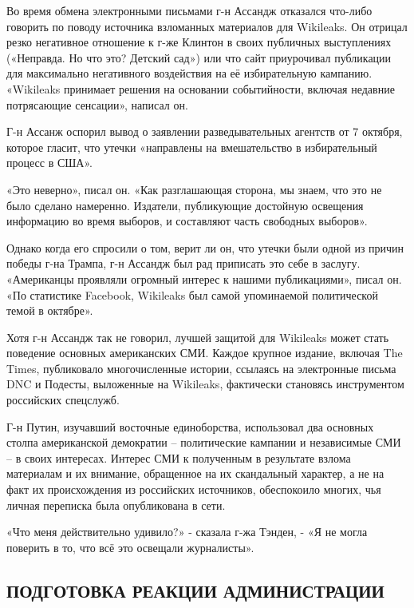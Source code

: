 Во время обмена электронными письмами г-н Ассандж отказался что-либо
говорить по поводу источника взломанных материалов для Wikileaks. Он
отрицал резко негативное отношение к г-же Клинтон в своих публичных
выступлениях («Неправда. Но что это? Детский сад») или что сайт
приурочивал публикации для максимально негативного воздействия на её
избирательную кампанию. «Wikileaks принимает решения на основании
событийности, включая недавние потрясающие сенсации», написал он.

Г-н Ассанж оспорил вывод о заявлении разведывательных агентств от 7
октября, которое гласит, что утечки «направлены на вмешательство в
избирательный процесс в США».

«Это неверно», писал он. «Как разглашающая сторона, мы знаем, что это не
было сделано намеренно. Издатели, публикующие достойную освещения
информацию во время выборов, и составляют часть свободных выборов».

Однако когда его спросили о том, верит ли он, что утечки были одной из
причин победы г-на Трампа, г-н Ассандж был рад приписать это себе в
заслугу. «Американцы проявляли огромный интерес к нашими публикациями»,
писал он. «По статистике Facebook, Wikileaks был самой упоминаемой
политической темой в октябре».

Хотя г-н Ассандж так не говорил, лучшей защитой для Wikileaks может
стать поведение основных американских СМИ. Каждое крупное издание,
включая The Times, публиковало многочисленные истории, ссылаясь на
электронные письма DNC и Подесты, выложенные на Wikileaks, фактически
становясь инструментом российских спецслужб.

Г-н Путин, изучавший восточные единоборства, использовал два основных
столпа американской демократии -- политические кампании и независимые
СМИ -- в своих интересах. Интерес СМИ к полученным в результате взлома
материалам и их внимание, обращенное на их скандальный характер, а не на
факт их происхождения из российских источников, обеспокоило многих, чья
личная переписка была опубликована в сети.

«Что меня действительно удивило?» - сказала г-жа Тэнден, - «Я не могла
поверить в то, что всё это освещали журналисты».

\hypertarget{ux43fux43eux434ux433ux43eux442ux43eux432ux43aux430-ux440ux435ux430ux43aux446ux438ux438-ux430ux434ux43cux438ux43dux438ux441ux442ux440ux430ux446ux438ux438}{%
\subsection{\texorpdfstring{\textbf{ПОДГОТОВКА РЕАКЦИИ
АДМИНИСТРАЦИИ}}{ПОДГОТОВКА РЕАКЦИИ АДМИНИСТРАЦИИ}}\label{ux43fux43eux434ux433ux43eux442ux43eux432ux43aux430-ux440ux435ux430ux43aux446ux438ux438-ux430ux434ux43cux438ux43dux438ux441ux442ux440ux430ux446ux438ux438}}

